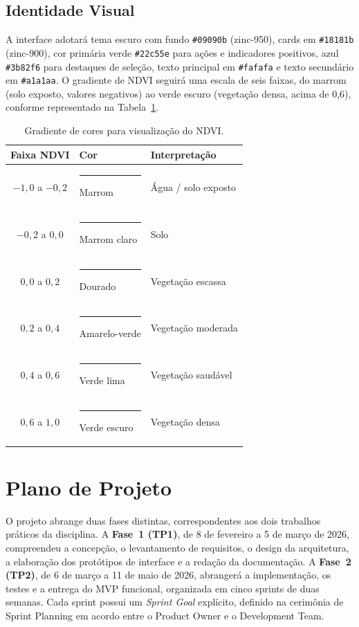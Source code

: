 \documentclass[12pt, a4paper]{article}
\begin{document}
\subsection{Identidade Visual}

A interface adotará tema escuro com fundo \texttt{\#09090b} (zinc-950), cards em \texttt{\#18181b} (zinc-900), cor primária verde \texttt{\#22c55e} para ações e indicadores positivos, azul \texttt{\#3b82f6} para destaques de seleção, texto principal em \texttt{\#fafafa} e texto secundário em \texttt{\#a1a1aa}. O gradiente de NDVI seguirá uma escala de seis faixas, do marrom (solo exposto, valores negativos) ao verde escuro (vegetação densa, acima de 0,6), conforme representado na Tabela~\ref{tab:gradiente}.

\begin{table}[H]
\centering
\caption{Gradiente de cores para visualização do NDVI.}
\label{tab:gradiente}
\footnotesize
\begin{tabular}{cll}
\toprule
\textbf{Faixa NDVI} & \textbf{Cor} & \textbf{Interpretação} \\
\midrule
$-1{,}0$ a $-0{,}2$ & \textcolor{ndvilow}{\rule{0.8cm}{0.35cm}} Marrom & Água / solo exposto \\
$-0{,}2$ a $0{,}0$ & \textcolor{ndvilow!60}{\rule{0.8cm}{0.35cm}} Marrom claro & Solo \\
$0{,}0$ a $0{,}2$ & \textcolor{ndvimid}{\rule{0.8cm}{0.35cm}} Dourado & Vegetação escassa \\
$0{,}2$ a $0{,}4$ & \textcolor{ndvimid!60!ndvihigh}{\rule{0.8cm}{0.35cm}} Amarelo-verde & Vegetação moderada \\
$0{,}4$ a $0{,}6$ & \textcolor{ndvihigh!60}{\rule{0.8cm}{0.35cm}} Verde lima & Vegetação saudável \\
$0{,}6$ a $1{,}0$ & \textcolor{ndvihigh}{\rule{0.8cm}{0.35cm}} Verde escuro & Vegetação densa \\
\bottomrule
\end{tabular}
\end{table}

\section{Plano de Projeto}
\label{sec:plano}

O projeto abrange duas fases distintas, correspondentes aos dois trabalhos práticos da disciplina. A \textbf{Fase~1 (TP1)}, de 8 de fevereiro a 5 de março de 2026, compreendeu a concepção, o levantamento de requisitos, o design da arquitetura, a elaboração dos protótipos de interface e a redação da documentação. A \textbf{Fase~2 (TP2)}, de 6 de março a 11 de maio de 2026, abrangerá a implementação, os testes e a entrega do MVP funcional, organizada em cinco sprints de duas semanas. Cada sprint possui um \textit{Sprint Goal} explícito, definido na cerimônia de Sprint Planning em acordo entre o Product Owner e o Development Team.
\end{document}
